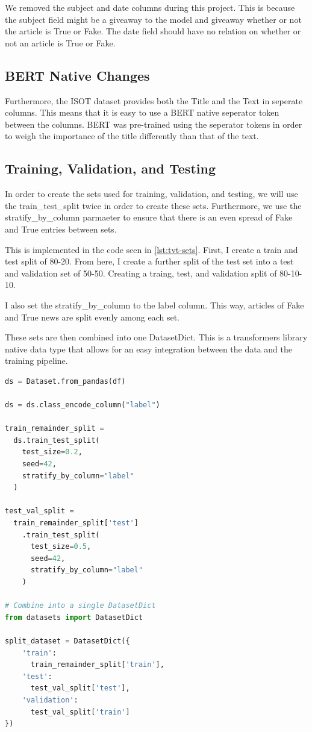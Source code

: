 \documentclass[conference]{IEEEtran}
\begin{document}
We removed the subject and date columns during this project. This is because the subject field might be a giveaway to the model and giveaway whether or not the article is True or Fake. The date field should have no relation on whether or not an article is True or Fake.

\subsection{BERT Native Changes}


Furthermore, the ISOT dataset provides both the Title and the Text in seperate columns. This means that it is easy to use a BERT native seperator token between the columns. BERT was pre-trained using the seperator tokens in order to weigh the importance of the title differently than that of the text.

\subsection{Training, Validation, and Testing}

In order to create the sets used for training, validation, and testing, we will use the train\_test\_split twice in order to create these sets. Furthermore, we use the stratify\_by\_column parmaeter to ensure that there is an even spread of Fake and True entries between sets.

This is implemented in the code seen in \ref{lst:tvt-sets}. First, I create a train and test split of 80-20. From here, I create a further split of the test set into a test and validation set of 50-50. Creating a traing, test, and validation split of 80-10-10. 

I also set the stratify\_by\_column to the label column. This way, articles of Fake and True news are split evenly among each set.

These sets are then combined into one DatasetDict. This is a transformers library native data type that allows for an easy integration between the data and the training pipeline.


\begin{lstlisting}[language=Python,caption={Training, Validation, and Testing Sets},label={lst:tvt-sets}]
ds = Dataset.from_pandas(df)

ds = ds.class_encode_column("label")

train_remainder_split =
  ds.train_test_split(
    test_size=0.2, 
    seed=42, 
    stratify_by_column="label"
  )

test_val_split =
  train_remainder_split['test']
    .train_test_split(
      test_size=0.5,
      seed=42,
      stratify_by_column="label"
    )

# Combine into a single DatasetDict
from datasets import DatasetDict

split_dataset = DatasetDict({
    'train':
      train_remainder_split['train'],
    'test':
      test_val_split['test'],
    'validation':
      test_val_split['train']
})
\end{lstlisting}
\end{document}
